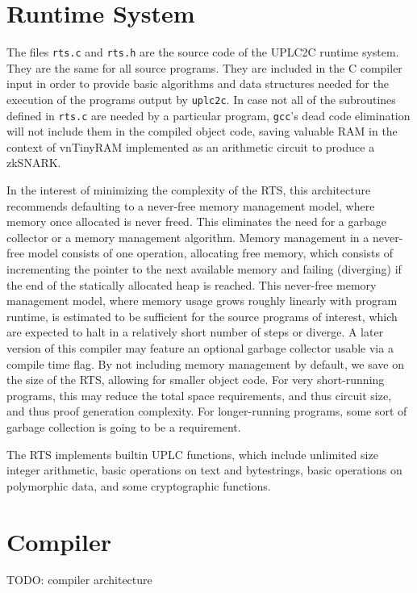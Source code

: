 \documentclass[12pt]{article}
\begin{document}
\section{Runtime System}

The files \texttt{rts.c} and \texttt{rts.h} are the source code of the UPLC2C runtime system. They are the same for all source programs. They are included in the C compiler input in order to provide basic algorithms and data structures needed for the execution of the programs output by \texttt{uplc2c}. In case not all of the subroutines defined in \texttt{rts.c} are needed by a particular program, \texttt{gcc}'s dead code elimination will not include them in the compiled object code, saving valuable RAM in the context of vnTinyRAM implemented as an arithmetic circuit to produce a zkSNARK.

In the interest of minimizing the complexity of the RTS, this architecture recommends defaulting to a never-free memory management model, where memory once allocated is never freed. This eliminates the need for a garbage collector or a memory management algorithm. Memory management in a never-free model consists of one operation, allocating free memory, which consists of incrementing the pointer to the next available memory and failing (diverging) if the end of the statically allocated heap is reached. This never-free memory management model, where memory usage grows roughly linearly with program runtime, is estimated to be sufficient for the source programs of interest, which are expected to halt in a relatively short number of steps or diverge. A later version of this compiler may feature an optional garbage collector usable via a compile time flag. By not including memory management by default, we save on the size of the RTS, allowing for smaller object code. For very short-running programs, this may reduce the total space requirements, and thus circuit size, and thus proof generation complexity. For longer-running programs, some sort of garbage collection is going to be a requirement.

The RTS implements builtin UPLC functions, which include unlimited size integer arithmetic, basic operations on text and bytestrings, basic operations on polymorphic data, and some cryptographic functions.

\section{Compiler}

TODO: compiler architecture
\end{document}
